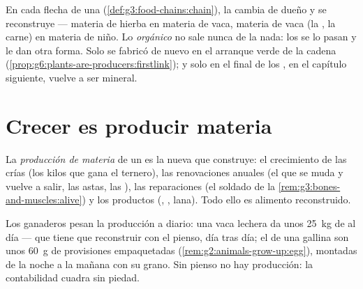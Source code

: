 \begin{remark}\label{rem:g6:matter-from-food:hands}
En cada flecha de una 
(\cref{def:g3:food-chains:chain}), la  cambia de dueño y
se reconstruye --- materia de hierba en materia de vaca, materia de
vaca (la , la carne) en materia de niño. Lo \emph{orgánico} no sale
nunca de la nada: los  se lo pasan y le dan otra forma. Solo
se fabricó de nuevo en el arranque verde de la cadena
(\cref{prop:g6:plants-are-producers:firstlink}); y solo en el final de
los , en el capítulo siguiente, vuelve a ser mineral.
\end{remark}

\section{Crecer es producir materia}

\begin{definition}\label{def:g6:matter-from-food:production}
La \emph{producción de materia} de un
 es la  nueva que construye: el crecimiento de las
crías (los kilos que gana el ternero), las renovaciones anuales (el 
que se muda y vuelve a salir, las astas, las ), las reparaciones
(el  soldado de la \cref{rem:g3:bones-and-muscles:alive}) y los
productos (, , lana). Todo ello es alimento reconstruido.
\end{definition}

\begin{example}\label{ex:g6:matter-from-food:weighing}
Los ganaderos pesan la producción a diario: una vaca lechera da unos
\qty{25}{kg} de  al día ---  que tiene que
reconstruir con el pienso, día tras día; el  de una gallina son
unos \qty{60}{g} de provisiones empaquetadas
(\cref{rem:g2:animals-grow-up:egg}), montadas de la noche a la mañana
con su grano. Sin pienso no hay producción: la contabilidad cuadra sin
piedad.
\end{example}


